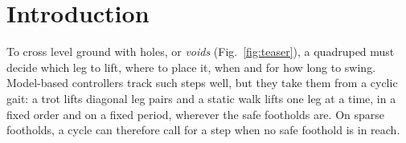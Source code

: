 \section{Introduction}
\label{sec:introduction}



 To cross level ground with holes, or \emph{voids}
(Fig.~\ref{fig:teaser}), a quadruped must decide which leg to lift,
where to place it, when and for how long to swing. Model-based controllers
\citep{dicarlo_dynamic_2018, ocs2} track such steps well, but they take
them from a cyclic gait: a trot lifts diagonal leg pairs and a static
walk lifts one leg at a time, in a fixed order and on a fixed period,
wherever the safe footholds are. On sparse footholds, a cycle can
therefore call for a step when no safe foothold is in reach.

